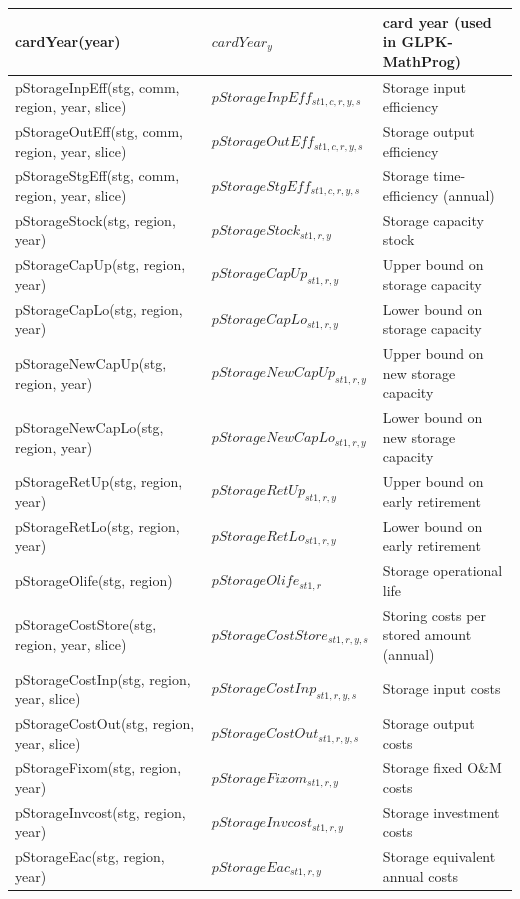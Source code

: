 \documentclass{article}
\begin{document}
\begin{longtable}{|p{10cm}|p{5cm}|p{9cm}|}
 \hline
cardYear(year) & $cardYear_{y}$ & card year (used in GLPK-MathProg) \\ 
 \hline
pStorageInpEff(stg, comm, region, year, slice) & $pStorageInpEff_{st1,c,r,y,s}$ & Storage input efficiency \\ 
 \hline
pStorageOutEff(stg, comm, region, year, slice) & $pStorageOutEff_{st1,c,r,y,s}$ & Storage output efficiency \\ 
 \hline
pStorageStgEff(stg, comm, region, year, slice) & $pStorageStgEff_{st1,c,r,y,s}$ & Storage time-efficiency (annual) \\ 
 \hline
pStorageStock(stg, region, year) & $pStorageStock_{st1,r,y}$ & Storage capacity stock \\ 
 \hline
pStorageCapUp(stg, region, year) & $pStorageCapUp_{st1,r,y}$ & Upper bound on storage capacity \\ 
 \hline
pStorageCapLo(stg, region, year) & $pStorageCapLo_{st1,r,y}$ & Lower bound on storage capacity \\ 
 \hline
pStorageNewCapUp(stg, region, year) & $pStorageNewCapUp_{st1,r,y}$ & Upper bound on new storage capacity \\ 
 \hline
pStorageNewCapLo(stg, region, year) & $pStorageNewCapLo_{st1,r,y}$ & Lower bound on new storage capacity \\ 
 \hline
pStorageRetUp(stg, region, year) & $pStorageRetUp_{st1,r,y}$ & Upper bound on early retirement \\ 
 \hline
pStorageRetLo(stg, region, year) & $pStorageRetLo_{st1,r,y}$ & Lower bound on early retirement \\ 
 \hline
pStorageOlife(stg, region) & $pStorageOlife_{st1,r}$ & Storage operational life \\ 
 \hline
pStorageCostStore(stg, region, year, slice) & $pStorageCostStore_{st1,r,y,s}$ & Storing costs per stored amount (annual) \\ 
 \hline
pStorageCostInp(stg, region, year, slice) & $pStorageCostInp_{st1,r,y,s}$ & Storage input costs \\ 
 \hline
pStorageCostOut(stg, region, year, slice) & $pStorageCostOut_{st1,r,y,s}$ & Storage output costs \\ 
 \hline
pStorageFixom(stg, region, year) & $pStorageFixom_{st1,r,y}$ & Storage fixed O\&M costs \\ 
 \hline
pStorageInvcost(stg, region, year) & $pStorageInvcost_{st1,r,y}$ & Storage investment costs \\ 
 \hline
pStorageEac(stg, region, year) & $pStorageEac_{st1,r,y}$ & Storage equivalent annual costs \\ 

\end{longtable}
\end{document}
